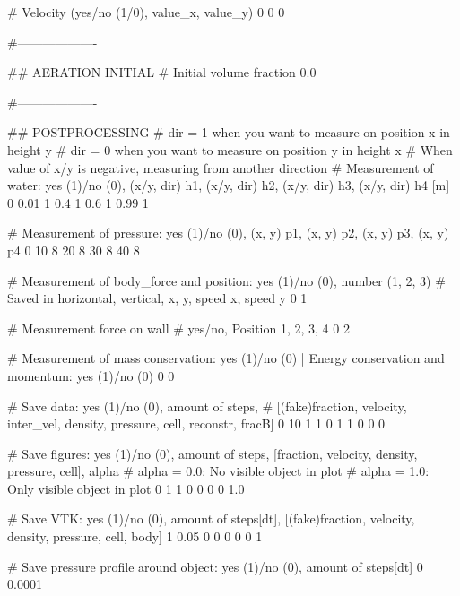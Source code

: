 # Velocity (yes/no (1/0), value_x, value_y)
0 0 0

#-------------------

## AERATION INITIAL
# Initial volume fraction
0.0

#-------------------

## POSTPROCESSING
# dir = 1 when you want to measure on position x in height y
# dir = 0 when you want to measure on position y in height x
# When value of x/y is negative, measuring from another direction
# Measurement of water: yes (1)/no (0), (x/y, dir) h1, (x/y, dir) h2, (x/y, dir) h3, (x/y, dir) h4 [m]
0   0.01 1  0.4 1  0.6 1  0.99 1

# Measurement of pressure: yes (1)/no (0), (x, y) p1, (x, y) p2, (x, y) p3, (x, y) p4
0	10 8	20 8     30 8	40 8

# Measurement of body_force and position: yes (1)/no (0), number (1, 2, 3)
# Saved in horizontal, vertical, x, y, speed x, speed y
0 1

# Measurement force on wall
# yes/no, Position 1, 2, 3, 4
0 2

# Measurement of mass conservation: yes (1)/no (0) | Energy conservation and momentum: yes (1)/no (0)
0 0

# Save data: yes (1)/no (0), amount of steps,
# [(fake)fraction, velocity, inter_vel, density, pressure, cell, reconstr, fracB]
0	10	1 1 0 1 1 0 0 0

# Save figures: yes (1)/no (0), amount of steps, [fraction, velocity, density, pressure, cell], alpha
# alpha = 0.0: No visible object in plot
# alpha = 1.0: Only visible object in plot
0 	1	1 0 0 0 0	1.0

# Save VTK: yes (1)/no (0), amount of steps[dt], [(fake)fraction, velocity, density, pressure, cell, body]
1 	0.05	0 0 0 0 0 1

# Save pressure profile around object: yes (1)/no (0), amount of steps[dt]
0  0.0001
